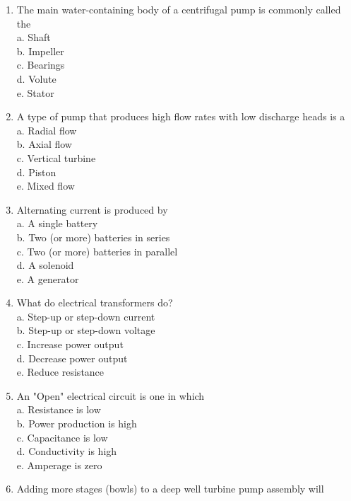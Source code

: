 \begin{enumerate}[1.]
  
\item The main water-containing body of a centrifugal pump is commonly called the\\
a. Shaft\\
b. Impeller\\
c. Bearings\\
d. Volute\\
e. Stator

\item A type of pump that produces high flow rates with low discharge heads is a\\
a. Radial flow\\

b. Axial flow\\

c. Vertical turbine\\

d. Piston\\

e. Mixed flow\\

\item Alternating current is produced by\\
a. A single battery\\
b. Two (or more) batteries in series\\
c. Two (or more) batteries in parallel\\
d. A solenoid\\
e. A generator\\ 

\item What do electrical transformers do?\\
a. Step-up or step-down current\\
b. Step-up or step-down voltage\\
c. Increase power output\\
d. Decrease power output\\
e. Reduce resistance\\

\item An "Open" electrical circuit is one in which\\
a. Resistance is low\\
b. Power production is high\\
c. Capacitance is low\\
d. Conductivity is high\\
e. Amperage is zero

\item Adding more stages (bowls) to a deep well turbine pump assembly will\\


\end{enumerate}
